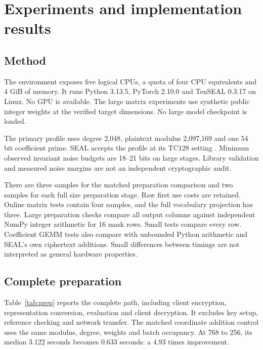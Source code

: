 \documentclass[10pt,twocolumn]{article}
\begin{document}
\section{Experiments and implementation results}
\subsection{Method}
The environment exposes five logical CPUs, a quota of four CPU equivalents and
4 GiB of memory. It runs Python 3.13.5, PyTorch 2.10.0 and TenSEAL 0.3.17 on Linux.
No GPU is available. The large matrix experiments use synthetic public integer
weights at the verified target dimensions. No large model checkpoint is loaded.

The primary profile uses degree 2,048, plaintext modulus 2,097,169 and one 54 bit
coefficient prime. SEAL accepts the profile at its TC128 setting
\cite{seal,bfv}. Minimum observed invariant noise budgets are 18--21 bits on
large stages. Library validation and measured noise margins are not an
independent cryptographic audit.

There are three samples for the matched preparation comparison and two samples
for each full size preparation stage. Raw first use costs are retained. Online
matrix tests contain four samples, and the full vocabulary projection has three.
Large preparation checks compare all output columns against independent NumPy
integer arithmetic for 16 mask rows. Small tests compare every row. Coefficient
GEMM tests also compare with unbounded Python arithmetic and SEAL's own
ciphertext additions. Small differences between timings are not interpreted as
general hardware properties.

\subsection{Complete preparation}
Table~\ref{tab:prep} reports the complete path, including client encryption,
representation conversion, evaluation and client decryption. It excludes key
setup, reference checking and network transfer. The matched coordinate addition
control uses the same modulus, degree, weights and batch occupancy. At 768 to
256, its median 3.122 seconds becomes 0.633 seconds: a 4.93 times improvement.
\end{document}
